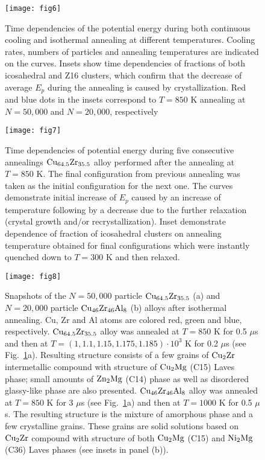 \documentclass[jcp,twocolumn,superscriptaddress,floatfix,graphicx,showpacs]{revtex4-1}
\begin{document}
\begin{figure}
  \centering
  \texttt{[image: fig6]}\\
  \caption{Time dependencies of the potential energy during both continuous cooling and isothermal annealing at different temperatures. Cooling rates, numbers of particles and annealing temperatures are indicated on the curves. Insets show time dependencies of fractions of both icosahedral and Z16 clusters, which confirm that the decrease of average $E_p$ during the annealing is caused by crystallization. Red and blue dots in the insets correspond to $T=850$ K annealing at $N=50,000$ and $N=20,000$, respectively}
  \label{fig:ann}
\end{figure}

 \begin{figure}
  \centering
  \texttt{[image: fig7]}\\
  \caption{Time dependencies of potential energy during five consecutive annealings ${\rm Cu_{64.5}Zr_{35.5}}$ alloy performed after the annealing at $T = 850$ K. The final configuration from previous annealing was taken as the initial configuration for the next one. The curves demonstrate initial increase of $E_p$ caused by an increase of temperature following by a decrease due to the further relaxation (crystal growth and/or recrystallization). Inset demonstrate dependence of fraction of icosahedral clusters on annealing temperature obtained for final configurations which were instantly quenched down to $T=300$ K and then relaxed.}
   \label{fig:ann2}
\end{figure}

\begin{figure}
  \centering
  \texttt{[image: fig8]}\\
  \caption{Snapshots of the $N=50,000$ particle ${\rm Cu_{64.5}Zr_{35.5}}$ (a) and $N=20,000$ particle ${\rm Cu_{46}Zr_{46}Al_{8}}$ (b) alloys after isothermal annealing. Cu, Zr and Al atoms are colored red, green and blue, respectively. ${\rm Cu_{64.5}Zr_{35.5}}$ alloy was annealed at $T=850$ K for 0.5 $\mu$s and then at $T= (1, 1.1, 1.15, 1.175, 1.185)\cdot 10^3$ K for 0.2 $\mu$s (see Fig.~\ref{fig:ann}a). Resulting structure consists of a few grains of ${\rm Cu_2Zr}$ intermetallic compound with structure of ${\rm Cu_2Mg}$ (C15) Laves phase; small amounts of ${\rm Zn_2Mg}$ (C14) phase as well as disordered glassy-like phase are also presented. ${\rm Cu_{46}Zr_{46}Al_{8}}$ alloy was annealed at $T=850$ K for 3 $\mu$s (see Fig.~\ref{fig:ann}a) and then at $T=1000$ K for 0.5 $\mu$s. The resulting structure is the mixture of amorphous phase and a few crystalline grains. These grains are solid solutions based on ${\rm Cu_2Zr}$ compound with structure of both ${\rm Cu_2Mg}$ (C15) and ${\rm Ni_2Mg}$ (C36) Laves phases (see insets in panel (b)).}
   \label{fig:snapshots_ann}
\end{figure}
\end{document}
